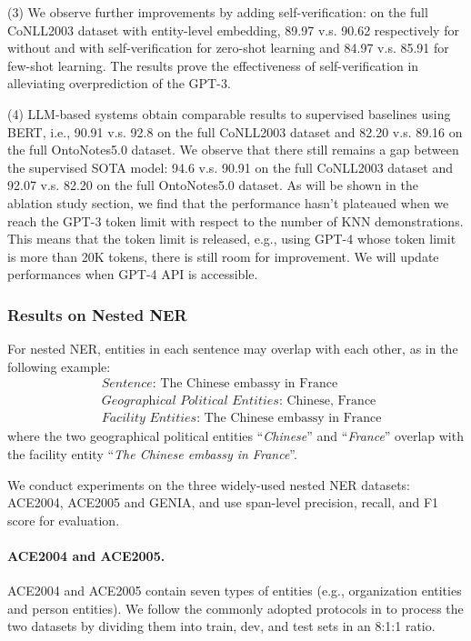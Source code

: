 \documentclass[11pt]{article}
\begin{document}
(3) We observe further improvements by adding self-verification: on the full CoNLL2003 dataset with entity-level embedding, 89.97 v.s. 90.62 
respectively for without and with self-verification
for zero-shot learning and 84.97 v.s. 85.91 for few-shot learning. 
The results prove the effectiveness of self-verification in alleviating overprediction of the GPT-3.

(4) LLM-based systems obtain comparable results to supervised baselines using BERT, i.e., 90.91 v.s. 92.8 on the full CoNLL2003 dataset and 82.20 v.s. 89.16 on the full OntoNotes5.0 dataset.
We observe that there still remains a gap between the supervised SOTA model: 94.6 v.s. 90.91 on the full CoNLL2003 dataset and 92.07 v.s. 82.20 on the full OntoNotes5.0 dataset.
As will be shown in the ablation study section, 
we find that the performance hasn't plateaued when we reach the GPT-3 token limit with respect to the number of KNN demonstrations. 
This means that the token limit is released, e.g., using GPT-4 whose token limit is more than 20K tokens, 
there is still room for improvement. 
We will update performances when  GPT-4 API is accessible.

\subsubsection{Results on Nested NER}
For nested NER, entities in each sentence may overlap with each other, as in the following example:
\begin{equation}
\nonumber
    \begin{aligned}
    	&\textit{Sentence}\text{: The Chinese embassy in France}\\
    	&\textit{Geographical Political Entities}\text{: Chinese, France}\\
    	&\textit{Facility Entities}\text{: The Chinese embassy in France}
    \end{aligned}
\end{equation}
where the two geographical political entities “\textit{Chinese}” and “\textit{France}” overlap with the facility entity “\textit{The Chinese embassy in France}”.

We conduct experiments on the three widely-used nested NER  datasets: ACE2004, ACE2005 and GENIA, and use span-level precision, recall, and F1 score for evaluation.

\paragraph{ACE2004 and ACE2005.}
ACE2004 \cite{doddington2004automatic} and ACE2005 \cite{christopher2006ace}  contain seven types of entities (e.g., organization entities and person entities). We follow the commonly adopted protocols in  to process the two datasets by dividing them into train, dev, and test sets in an 8:1:1 ratio. 
\end{document}
